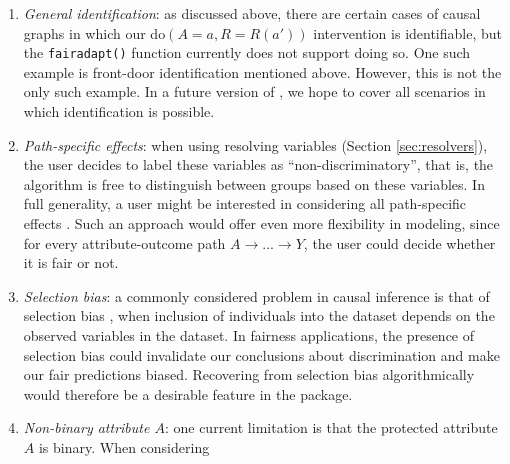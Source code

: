 \documentclass[
  nojss]{jss}
\begin{document}
\begin{enumerate}
\def\labelenumi{\arabic{enumi}.}
\item
  \emph{General identification}: as discussed above, there are certain
  cases of causal graphs in which our do\((A = a, R = R(a'))\)
  intervention is identifiable, but the \texttt{fairadapt()} function
  currently does not support doing so. One such example is front-door
  identification mentioned above. However, this is not the only such
  example. In a future version of , we hope to cover all
  scenarios in which identification is possible.
\item
  \emph{Path-specific effects}: when using resolving variables (Section
  \ref{sec:resolvers}), the user decides to label these variables as
  ``non-discriminatory'', that is, the algorithm is free to distinguish
  between groups based on these variables. In full generality, a user
  might be interested in considering all path-specific effects
  \citep{avin2005identifiability}. Such an approach would offer even
  more flexibility in modeling, since for every attribute-outcome path
  \(A \rightarrow ... \rightarrow Y\), the user could decide whether it
  is fair or not.
\item
  \emph{Selection bias}: a commonly considered problem in causal
  inference is that of selection bias \citep{hernan2004structural}, when
  inclusion of individuals into the dataset depends on the observed
  variables in the dataset. In fairness applications, the presence of
  selection bias could invalidate our conclusions about discrimination
  and make our fair predictions biased. Recovering from selection bias
  algorithmically would therefore be a desirable feature in the
   package.
\item
  \emph{Non-binary attribute \(A\)}: one current limitation is that the
  protected attribute \(A\) is binary. When considering
\end{enumerate}


\end{document}
